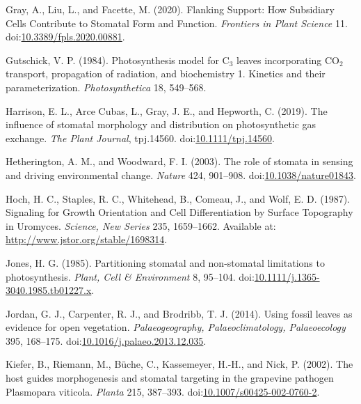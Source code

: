 \documentclass[utf8]{frontiersSCNS}
\newlength{\cslhangindent}
\newenvironment{cslreferences}%
  {\setlength{\parindent}{0pt}%
  \everypar{\setlength{\hangindent}{\cslhangindent}}\ignorespaces}%
  {\par}
\begin{document}
\begin{cslreferences}
\leavevmode\hypertarget{ref-gray_flanking_2020}{}%
Gray, A., Liu, L., and Facette, M. (2020). Flanking Support: How
Subsidiary Cells Contribute to Stomatal Form and Function.
\emph{Frontiers in Plant Science} 11.
doi:\href{https://doi.org/10.3389/fpls.2020.00881}{10.3389/fpls.2020.00881}.

\leavevmode\hypertarget{ref-gutschick_photosynthesis_1984}{}%
Gutschick, V. P. (1984). Photosynthesis model for C\(_{\textrm{3}}\)
leaves incorporating CO\(_{\textrm{2}}\) transport, propagation of
radiation, and biochemistry 1. Kinetics and their parameterization.
\emph{Photosynthetica} 18, 549--568.

\leavevmode\hypertarget{ref-harrison_influence_2019}{}%
Harrison, E. L., Arce Cubas, L., Gray, J. E., and Hepworth, C. (2019).
The influence of stomatal morphology and distribution on photosynthetic
gas exchange. \emph{The Plant Journal}, tpj.14560.
doi:\href{https://doi.org/10.1111/tpj.14560}{10.1111/tpj.14560}.

\leavevmode\hypertarget{ref-hetherington_role_2003}{}%
Hetherington, A. M., and Woodward, F. I. (2003). The role of stomata in
sensing and driving environmental change. \emph{Nature} 424, 901--908.
doi:\href{https://doi.org/10.1038/nature01843}{10.1038/nature01843}.

\leavevmode\hypertarget{ref-hoch_signaling_1987}{}%
Hoch, H. C., Staples, R. C., Whitehead, B., Comeau, J., and Wolf, E. D.
(1987). Signaling for Growth Orientation and Cell Differentiation by
Surface Topography in Uromyces. \emph{Science, New Series} 235,
1659--1662. Available at: \url{http://www.jstor.org/stable/1698314}.

\leavevmode\hypertarget{ref-jones_partitioning_1985}{}%
Jones, H. G. (1985). Partitioning stomatal and non-stomatal limitations
to photosynthesis. \emph{Plant, Cell \& Environment} 8, 95--104.
doi:\href{https://doi.org/10.1111/j.1365-3040.1985.tb01227.x}{10.1111/j.1365-3040.1985.tb01227.x}.

\leavevmode\hypertarget{ref-jordan_using_2014}{}%
Jordan, G. J., Carpenter, R. J., and Brodribb, T. J. (2014). Using
fossil leaves as evidence for open vegetation. \emph{Palaeogeography,
Palaeoclimatology, Palaeoecology} 395, 168--175.
doi:\href{https://doi.org/10.1016/j.palaeo.2013.12.035}{10.1016/j.palaeo.2013.12.035}.

\leavevmode\hypertarget{ref-kiefer_host_2002}{}%
Kiefer, B., Riemann, M., Büche, C., Kassemeyer, H.-H., and Nick, P.
(2002). The host guides morphogenesis and stomatal targeting in the
grapevine pathogen Plasmopara viticola. \emph{Planta} 215, 387--393.
doi:\href{https://doi.org/10.1007/s00425-002-0760-2}{10.1007/s00425-002-0760-2}.


\end{cslreferences}
\end{document}
